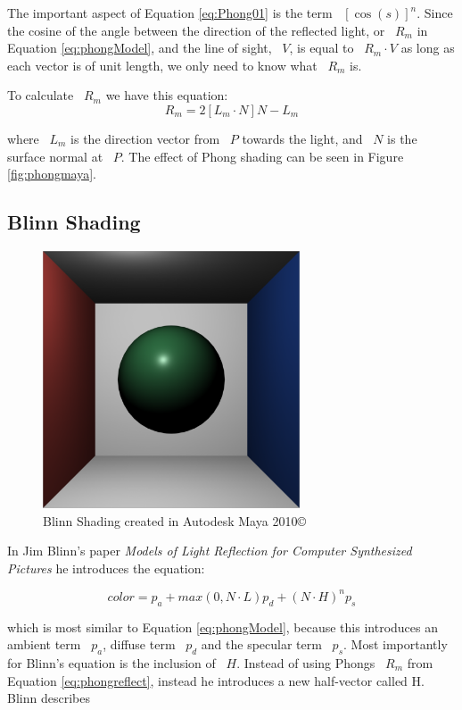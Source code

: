 The important aspect of Equation \ref{eq:Phong01} is the term ~$[\cos(s)]^{n}$.  Since the cosine of the angle between the direction of the reflected light, or ~$R_{m}$ in Equation \ref{eq:phongModel}, and the line of sight, ~$V$, is equal to ~$R_{m} \cdot V$ as long as each vector is of unit length, we only need to know what ~$R_{m}$ is.

To calculate ~$R_{m}$ we have this equation:
\begin{equation}
\label{eq:phongreflect}
R_m = 2[L_m \cdot N]N - L_m
\end{equation}

where ~$L_{m}$ is the direction vector from ~$P$ towards the light, and ~$N$ is the surface normal at ~$P$.  The effect of Phong shading can be seen in Figure \ref{fig:phongmaya}.

\subsection{Blinn Shading}
\label{subsec:Blinn Shading}
\begin{figure}[h]
\centering
\includegraphics[height=3.0in]{figures/blinn_Maya.png}
\caption{Blinn Shading created in Autodesk Maya 2010\copyright}
\label{fig:gooch}
\end{figure}
In Jim Blinn's paper \textit{Models of Light Reflection for Computer Synthesized Pictures} he introduces the equation\cite{Blinn:1977}:

\begin{equation}
\label{eq:blinnModel01}
color = p_{a} + max(0,N\cdot L) p_{d} +  (N \cdot H)^n p_{s}
\end{equation}

which is most similar to Equation \ref{eq:phongModel}, because this introduces an ambient term ~$p_{a}$, diffuse term ~$p_{d}$ and the specular term ~$p_{s}$.  Most importantly for Blinn's equation is the inclusion of ~$H$.  Instead of using Phongs ~$R_{m}$ from Equation \ref{eq:phongreflect}, instead he introduces a new half-vector called H.  Blinn describes

